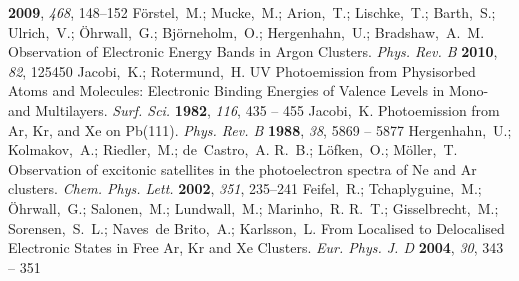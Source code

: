 \documentclass[journal=jpccck,manuscript=article]{achemso}
\begin{document}
\begin{mcitethebibliography}{73}
  \textbf{2009}, \emph{468}, 148--152\relax
\mciteBstWouldAddEndPuncttrue
\mciteSetBstMidEndSepPunct{\mcitedefaultmidpunct}
{\mcitedefaultendpunct}{\mcitedefaultseppunct}\relax
\EndOfBibitem
{}
F\"orstel,~M.; Mucke,~M.; Arion,~T.; Lischke,~T.; Barth,~S.; Ulrich,~V.;
  \"Ohrwall,~G.; Bj\"orneholm,~O.; Hergenhahn,~U.; Bradshaw,~A.~M. Observation
  of Electronic Energy Bands in Argon Clusters. \emph{Phys. Rev. B}
  \textbf{2010}, \emph{82}, 125450\relax
\mciteBstWouldAddEndPuncttrue
\mciteSetBstMidEndSepPunct{\mcitedefaultmidpunct}
{\mcitedefaultendpunct}{\mcitedefaultseppunct}\relax
\EndOfBibitem
{}
Jacobi,~K.; Rotermund,~H. UV Photoemission from Physisorbed Atoms and
  Molecules: Electronic Binding Energies of Valence Levels in Mono- and
  Multilayers. \emph{Surf. Sci.} \textbf{1982}, \emph{116}, 435 -- 455\relax
\mciteBstWouldAddEndPuncttrue
\mciteSetBstMidEndSepPunct{\mcitedefaultmidpunct}
{\mcitedefaultendpunct}{\mcitedefaultseppunct}\relax
\EndOfBibitem
{}
Jacobi,~K. Photoemission from Ar, Kr, and Xe on Pb(111). \emph{Phys. Rev. B}
  \textbf{1988}, \emph{38}, 5869 -- 5877\relax
\mciteBstWouldAddEndPuncttrue
\mciteSetBstMidEndSepPunct{\mcitedefaultmidpunct}
{\mcitedefaultendpunct}{\mcitedefaultseppunct}\relax
\EndOfBibitem
{}
Hergenhahn,~U.; Kolmakov,~A.; Riedler,~M.; de~Castro,~A. R.~B.; L\"ofken,~O.;
  M\"oller,~T. Observation of excitonic satellites in the photoelectron spectra
  of Ne and Ar clusters. \emph{Chem. Phys. Lett.} \textbf{2002}, \emph{351},
  235--241\relax
\mciteBstWouldAddEndPuncttrue
\mciteSetBstMidEndSepPunct{\mcitedefaultmidpunct}
{\mcitedefaultendpunct}{\mcitedefaultseppunct}\relax
\EndOfBibitem
{}
Feifel,~R.; Tchaplyguine,~M.; \"Ohrwall,~G.; Salonen,~M.; Lundwall,~M.;
  Marinho,~R. R.~T.; Gisselbrecht,~M.; Sorensen,~S.~L.; Naves~de Brito,~A.;
  Karlsson,~L.   From Localised to Delocalised Electronic States
  in Free Ar, Kr and Xe Clusters. \emph{Eur. Phys. J. D} \textbf{2004},
  \emph{30}, 343 -- 351\relax
\mciteBstWouldAddEndPuncttrue
\mciteSetBstMidEndSepPunct{\mcitedefaultmidpunct}

\end{mcitethebibliography}
\end{document}
